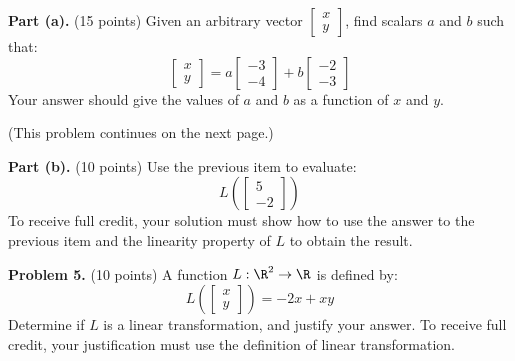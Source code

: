 \documentclass[12pt]{article}
\begin{document}
\textbf{Part (a).} (15 points) Given an arbitrary vector $\begin{bmatrix}x\\y\end{bmatrix}$, find scalars $a$ and $b$ such that:
\[
\begin{bmatrix}x\\y\end{bmatrix}=a\left[\begin{matrix}-3\\-4\end{matrix}\right]+b\left[\begin{matrix}-2\\-3\end{matrix}\right]
\]
Your answer should give the values of $a$ and $b$ as a function of $x$ and $y$.

\vfill
(This problem continues on the next page.)

\clearpage

\textbf{Part (b).} (10 points) Use the previous item to evaluate:
\[
L\left(\begin{bmatrix}5\\-2\end{bmatrix}\right)
\]
To receive full credit, your solution must show how to use the answer to the previous item and the linearity property of $L$ to obtain the result. 

\clearpage

\textbf{Problem 5.} (10 points) A function $L:\R^2\to\R$ is defined by:
\[
L\left(\begin{bmatrix}x\\y\end{bmatrix}\right)=-2x+xy
\]
Determine if $L$ is a linear transformation, and justify your answer. To receive full credit, your justification must use the definition of linear transformation.
\end{document}
